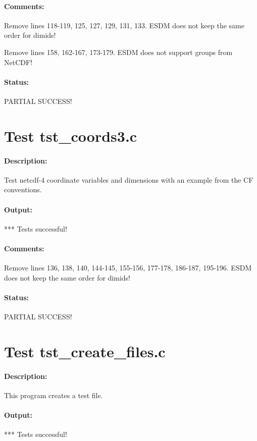 \paragraph{Comments:} Remove lines 118-119, 125, 127, 129, 131, 133. ESDM does not keep the same order for dimids!

Remove lines 158, 162-167, 173-179. ESDM does not support groups from NetCDF!

\paragraph{Status:} PARTIAL SUCCESS!

\section{Test tst\_coords3.c}

\paragraph{Description:} Test netcdf-4 coordinate variables and dimensions with an example from the CF conventions.

\paragraph{Output:} *** Tests successful!

\paragraph{Comments:} Remove lines 136, 138, 140, 144-145, 155-156, 177-178, 186-187, 195-196. ESDM does not keep the same order for dimids!

\paragraph{Status:} PARTIAL SUCCESS!

\section{Test tst\_create\_files.c}

\paragraph{Description:} This program creates a test file.

\paragraph{Output:} *** Tests successful!

